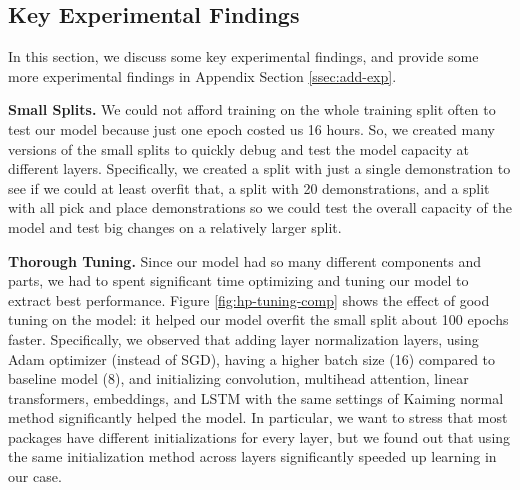 \documentclass[11pt,a4paper]{article}
\begin{document}
\subsection{Key Experimental Findings}

In this section, we discuss some key experimental findings, and provide some more experimental findings in Appendix Section \ref{ssec:add-exp}.

\textbf{Small Splits.} We could not afford training on the whole training split often to test our model because just one epoch costed us 16 hours. So, we created many versions of the small splits to quickly debug and test the model capacity at different layers. Specifically, we created a split with just a single demonstration to see if we could at least overfit that, a split with 20 demonstrations, and a split with all pick and place demonstrations so we could test the overall capacity of the model and test big changes on a relatively larger split. 

\textbf{Thorough Tuning.} Since our model had so many different components and parts, we had to spent significant time optimizing and tuning our model to extract best performance. Figure \ref{fig:hp-tuning-comp} shows the effect of good tuning on the model: it helped our model overfit the small split about 100 epochs faster. Specifically, we observed that adding layer normalization layers, using Adam optimizer (instead of SGD), having a higher batch size (16) compared to baseline model (8), and initializing convolution, multihead attention, linear transformers, embeddings, and LSTM with the same settings of Kaiming normal method significantly helped the model. In particular, we want to stress that most packages have different initializations for every layer, but we found out that using the same initialization method across layers significantly speeded up learning in our case.
\end{document}
